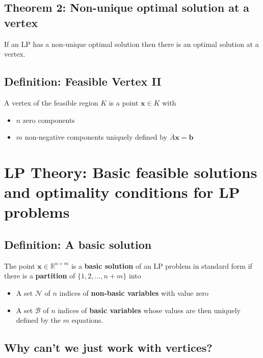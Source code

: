 \documentclass[11pt,a4paper]{article}
\begin{document}
\subsection*{Theorem 2: Non-unique optimal solution at a vertex}
If an LP has a non-unique optimal solution then there is an optimal solution at a vertex.

\subsection*{Definition: Feasible Vertex II}
A vertex of the feasible region $K$ is a point $\textbf{x} \in K$ with

\begin{itemize}
    \item $n$ zero components
    \item $m$ non-negative components uniquely defined by $\overline{A}\textbf{x} = \textbf{b}$
\end{itemize}

\section*{LP Theory: Basic feasible solutions and optimality conditions for LP problems}

\subsection*{Definition: A basic solution}
The point $\textbf{x} \in \mathbb{R}^{n+m}$ is a \textbf{basic solution} of an LP problem in
standard form if there is a \textbf{partition} of $\{1, 2, \ldots, n+m\}$ into

\begin{itemize}
    \item A set $\mathcal{N}$ of $n$ indices of \textbf{non-basic variables} with value zero
    \item A set $\mathcal{B}$ of $n$ indices of \textbf{basic variables} whose values are then
        uniquely defined by the $m$ equations.
\end{itemize}

\subsection*{Why can't we just work with vertices?}
\end{document}
